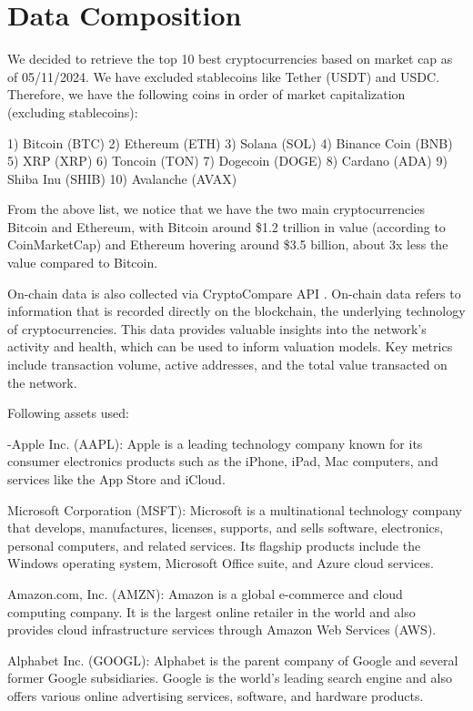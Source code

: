 \section{Data Composition}

We decided to retrieve the top 10 best cryptocurrencies based on market cap as of 05/11/2024. We have excluded stablecoins like Tether (USDT) and USDC. Therefore, we have the following coins in order of market capitalization (excluding stablecoins): 

1) Bitcoin (BTC)
2) Ethereum (ETH)
3) Solana (SOL)
4) Binance Coin (BNB)
5) XRP (XRP)
6) Toncoin (TON)
7) Dogecoin (DOGE)
8) Cardano (ADA)
9) Shiba Inu (SHIB)
10) Avalanche (AVAX)

From the above list, we notice that we have the two main cryptocurrencies Bitcoin and Ethereum, with Bitcoin around \$1.2 trillion in value (according to CoinMarketCap) and Ethereum hovering around \$3.5 billion, about 3x less the value compared to Bitcoin.

On-chain data is also collected via CryptoCompare API \cite{cryptocompare_api}. On-chain data refers to information that is recorded directly on the blockchain, the underlying technology of cryptocurrencies. This data provides valuable insights into the network's activity and health, which can be used to inform valuation models. Key metrics include transaction volume, active addresses, and the total value transacted on the network.

Following assets used:

-Apple Inc. (AAPL): Apple is a leading technology company known for its consumer electronics products such as the iPhone, iPad, Mac computers, and services like the App Store and iCloud.

Microsoft Corporation (MSFT): Microsoft is a multinational technology company that develops, manufactures, licenses, supports, and sells software, electronics, personal computers, and related services. Its flagship products include the Windows operating system, Microsoft Office suite, and Azure cloud services.

Amazon.com, Inc. (AMZN): Amazon is a global e-commerce and cloud computing company. It is the largest online retailer in the world and also provides cloud infrastructure services through Amazon Web Services (AWS).

Alphabet Inc. (GOOGL): Alphabet is the parent company of Google and several former Google subsidiaries. Google is the world’s leading search engine and also offers various online advertising services, software, and hardware products.

